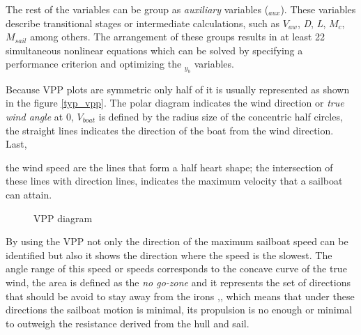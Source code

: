 The rest of the variables can be group as \textit{auxiliary} variables (\textit{$_{aux}$}). These variables describe transitional stages or intermediate calculations, such as $V_{aw}$, \textit{D}, \textit{L}, $M_{c}$, $M_{sail}$ among others. The arrangement of these groups results in at least 22 simultaneous nonlinear equations which can be solved by specifying a performance criterion and optimizing the \textit{$_{y_{b}}$} variables.
 
Because VPP plots are symmetric only half of it is usually represented as shown in the figure \ref {typ_vpp}. The polar diagram indicates the wind direction or \textit{true wind angle} at 0\degree , $V_{boat}$ is defined by the radius size of the concentric half circles, the straight lines indicates the direction of the boat from the wind direction. Last, 

the wind speed are the lines that form a half heart shape; the intersection of these lines with direction lines, indicates the maximum velocity that a sailboat can attain. \par 
\begin{figure} %
  \centering
  \hfill
  \caption{VPP diagram}
\label{vpp_diag} 
\end{figure}

By using the VPP not only the direction of the maximum sailboat speed can be identified but also it shows the direction where the speed is the slowest. The angle range of this speed or speeds corresponds to the concave curve of the true wind, the area is defined as the \textit{no go-zone} and it represents the set of directions that should be avoid to stay away from the irons \cite{yang2011control},\cite{denny2009float}, which means that under these directions the sailboat  motion is minimal, its propulsion is no enough or minimal to outweigh the resistance derived from the hull and sail.\par 

